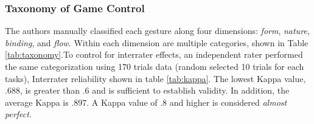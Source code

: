 \documentclass{sigchi}
\begin{document}
  \subsubsection{Taxonomy of Game Control}

  The authors manually classified each gesture along four dimensions: \emph{form}, \emph{nature}, \emph{binding}, and \emph{flow}. Within each dimension are multiple categories, shown in Table \ref{tab:taxonomy}.To control for interrater effects, an independent rater performed the same categorization using 170 trials data (random selected 10 trials for each tasks), Interrater reliability shown in table \ref{tab:kappa}. The lowest Kappa value, .688, is greater than .6 and is sufficient to establish validity. In addition, the average Kappa is .897. A Kappa value of .8 and higher is considered \textsl{almost perfect}.
\end{document}
